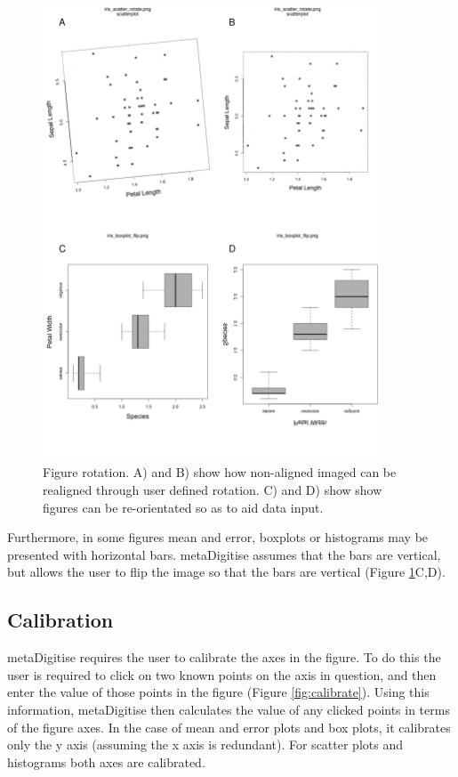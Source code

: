 \documentclass{article}
\begin{document}
\begin{figure}[!h] 
 \includegraphics[width=0.9\textwidth]{fig_rotate.pdf} 
 \caption{Figure rotation. A) and B) show how non-aligned imaged can be realigned through user defined rotation. C) and D) show show figures can be re-orientated so as to aid data input.}
\label{fig:rotate}
\end{figure}

Furthermore, in some figures mean and error, boxplots or histograms may be presented with horizontal bars. metaDigitise assumes that the bars are vertical, but allows the user to flip the image so that the bars are vertical (Figure \ref{fig:rotate}C,D).


\subsection{Calibration}
metaDigitise requires the user to calibrate the axes in the figure. To do this the user is required to click on two known points on the axis in question, and then enter the value of those points in the figure (Figure \ref{fig:calibrate}). Using this information, metaDigitise then calculates the value of any clicked points in terms of the figure axes. In the case of mean and error plots and box plots, it calibrates only the y axis (assuming the x axis is redundant). For scatter plots and histograms both axes are calibrated.
\end{document}
